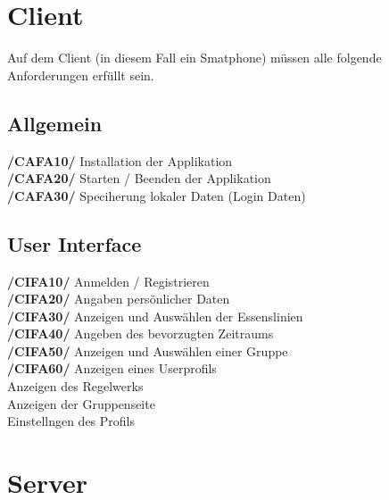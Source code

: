 \documentclass[a4paper]{scrreprt}
\begin{document}
\section{Client}
Auf dem Client (in diesem Fall ein Smatphone) müssen alle folgende Anforderungen erfüllt sein. 

\subsection{Allgemein}

\begin{addmargin}[25pt]{0pt} 
\textbf{/CAFA10/} Installation der Applikation \\
\textbf{/CAFA20/} Starten / Beenden der Applikation\\
\textbf{/CAFA30/} Speciherung lokaler Daten (Login Daten)\\
\end{addmargin}

\subsection{User Interface}

\begin{addmargin}[25pt]{0pt} 
\textbf{/CIFA10/} Anmelden / Registrieren \\
\textbf{/CIFA20/} Angaben persönlicher Daten\\
\textbf{/CIFA30/} Anzeigen und Auswählen der Essenslinien\\
\textbf{/CIFA40/} Angeben des bevorzugten Zeitraums\\
\textbf{/CIFA50/} Anzeigen und Auswählen einer Gruppe\\
\textbf{/CIFA60/} Anzeigen eines Userprofils\\
Anzeigen des Regelwerks\\
Anzeigen der Gruppenseite\\
Einstellngen des Profils\\
\end{addmargin}

\section{Server}
\end{document}
